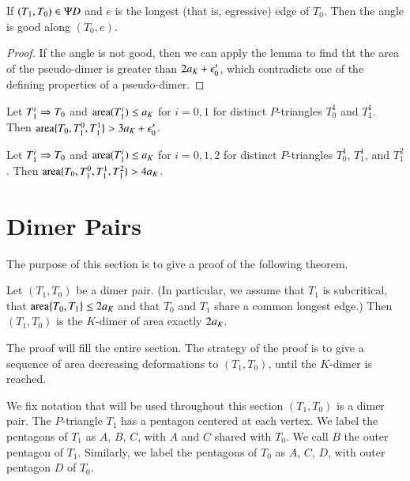 \begin{corollary} If $(T_1,T_0)\in \Psi D$ and $e$ is the longest (that is, egressive) edge of $T_0$.  Then the angle
is good along $(T_0,e)$.
\end{corollary}

\begin{proof} If the angle is not good, then we can apply the lemma to find tht the area of the pseudo-dimer is
greater than $2a_K + \epsilon_0'$, which contradicts one of the defining properties of a pseudo-dimer.
\end{proof}


\begin{lemma}
Let $T_1^i\Rightarrow T_0$ and ${\operatorname{area}}(T_1^i)\le a_K$ for $i=0,1$ for distinct $P$-triangles $T^1_0$ and $T^1_1$.
Then ${\operatorname{area}}\{T_0,T^0_1,T^1_1\} > 3a_K + \epsilon_0'$.
\end{lemma}


\begin{lemma}
Let $T_1^i\Rightarrow T_0$ and ${\operatorname{area}}(T_1^i)\le a_K$ for $i=0,1,2$ for distinct $P$-triangles $T^1_0$, $T^1_1$, and $T^2_1$.
Then ${\operatorname{area}}\{T_0,T^0_1,T^1_1,T^2_1\} > 4a_K$.
\end{lemma}


\section{Dimer Pairs}

The purpose of this section is to give a proof of the following theorem.  


\begin{theorem}
Let $(T_1,T_0)$ be a dimer pair.  (In particular, we assume that $T_1$ is subcritical,
that ${\operatorname{area}}\{T_0,T_1\}\le 2a_K$ and that $T_0$ and $T_1$ share a common longest edge.)
Then $(T_1,T_0)$ is the $K$-dimer of area exactly $2a_K$.
\end{theorem}

The proof will fill the entire section.
 The strategy
of the proof is to give a sequence of area decreasing deformations to $(T_1,T_0)$,
until the $K$-dimer is reached.

We fix notation that will be used throughout this section $(T_1,T_0)$ is a dimer pair.
The $P$-triangle $T_1$ has a pentagon centered at each vertex.  We label the pentagons of $T_1$ as
$A$, $B$, $C$, with $A$ and $C$ shared with $T_0$.  We call $B$ the outer pentagon of $T_1$.
Similarly, we label the pentagons of $T_0$ as $A$, $C$, $D$, with outer pentagon $D$ of $T_0$.


